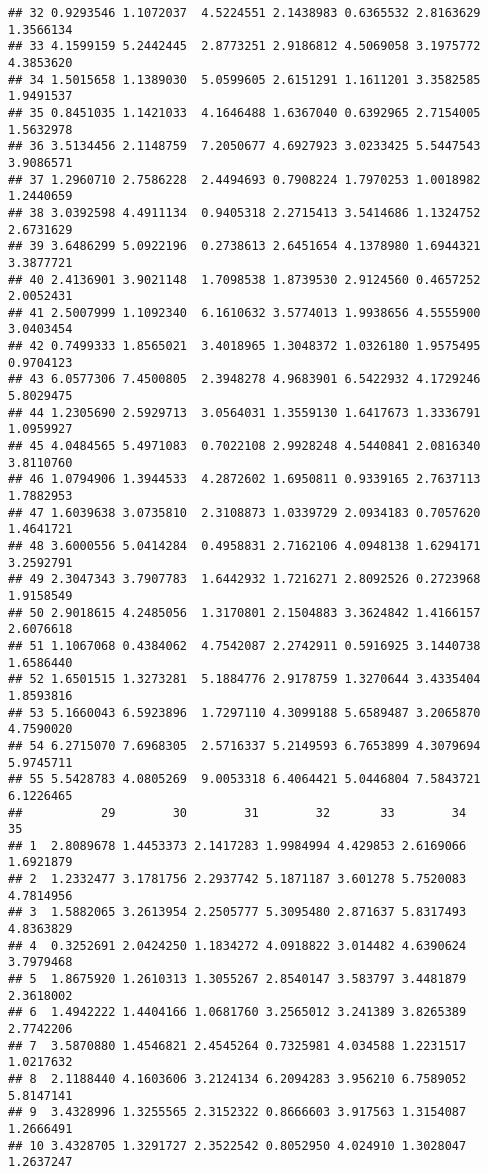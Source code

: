\documentclass[
]{article}
\begin{document}
\begin{verbatim}
## 32 0.9293546 1.1072037  4.5224551 2.1438983 0.6365532 2.8163629 1.3566134
## 33 4.1599159 5.2442445  2.8773251 2.9186812 4.5069058 3.1975772 4.3853620
## 34 1.5015658 1.1389030  5.0599605 2.6151291 1.1611201 3.3582585 1.9491537
## 35 0.8451035 1.1421033  4.1646488 1.6367040 0.6392965 2.7154005 1.5632978
## 36 3.5134456 2.1148759  7.2050677 4.6927923 3.0233425 5.5447543 3.9086571
## 37 1.2960710 2.7586228  2.4494693 0.7908224 1.7970253 1.0018982 1.2440659
## 38 3.0392598 4.4911134  0.9405318 2.2715413 3.5414686 1.1324752 2.6731629
## 39 3.6486299 5.0922196  0.2738613 2.6451654 4.1378980 1.6944321 3.3877721
## 40 2.4136901 3.9021148  1.7098538 1.8739530 2.9124560 0.4657252 2.0052431
## 41 2.5007999 1.1092340  6.1610632 3.5774013 1.9938656 4.5555900 3.0403454
## 42 0.7499333 1.8565021  3.4018965 1.3048372 1.0326180 1.9575495 0.9704123
## 43 6.0577306 7.4500805  2.3948278 4.9683901 6.5422932 4.1729246 5.8029475
## 44 1.2305690 2.5929713  3.0564031 1.3559130 1.6417673 1.3336791 1.0959927
## 45 4.0484565 5.4971083  0.7022108 2.9928248 4.5440841 2.0816340 3.8110760
## 46 1.0794906 1.3944533  4.2872602 1.6950811 0.9339165 2.7637113 1.7882953
## 47 1.6039638 3.0735810  2.3108873 1.0339729 2.0934183 0.7057620 1.4641721
## 48 3.6000556 5.0414284  0.4958831 2.7162106 4.0948138 1.6294171 3.2592791
## 49 2.3047343 3.7907783  1.6442932 1.7216271 2.8092526 0.2723968 1.9158549
## 50 2.9018615 4.2485056  1.3170801 2.1504883 3.3624842 1.4166157 2.6076618
## 51 1.1067068 0.4384062  4.7542087 2.2742911 0.5916925 3.1440738 1.6586440
## 52 1.6501515 1.3273281  5.1884776 2.9178759 1.3270644 3.4335404 1.8593816
## 53 5.1660043 6.5923896  1.7297110 4.3099188 5.6589487 3.2065870 4.7590020
## 54 6.2715070 7.6968305  2.5716337 5.2149593 6.7653899 4.3079694 5.9745711
## 55 5.5428783 4.0805269  9.0053318 6.4064421 5.0446804 7.5843721 6.1226465
##           29        30        31        32       33        34        35
## 1  2.8089678 1.4453373 2.1417283 1.9984994 4.429853 2.6169066 1.6921879
## 2  1.2332477 3.1781756 2.2937742 5.1871187 3.601278 5.7520083 4.7814956
## 3  1.5882065 3.2613954 2.2505777 5.3095480 2.871637 5.8317493 4.8363829
## 4  0.3252691 2.0424250 1.1834272 4.0918822 3.014482 4.6390624 3.7979468
## 5  1.8675920 1.2610313 1.3055267 2.8540147 3.583797 3.4481879 2.3618002
## 6  1.4942222 1.4404166 1.0681760 3.2565012 3.241389 3.8265389 2.7742206
## 7  3.5870880 1.4546821 2.4545264 0.7325981 4.034588 1.2231517 1.0217632
## 8  2.1188440 4.1603606 3.2124134 6.2094283 3.956210 6.7589052 5.8147141
## 9  3.4328996 1.3255565 2.3152322 0.8666603 3.917563 1.3154087 1.2666491
## 10 3.4328705 1.3291727 2.3522542 0.8052950 4.024910 1.3028047 1.2637247

\end{verbatim}
\end{document}
